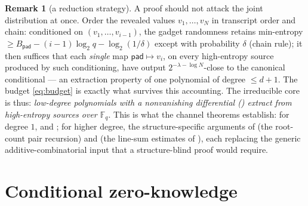 \documentclass{article}
\newcommand{\Fq}{\mathbb{F}_q}
\theoremstyle{definition}
\newtheorem{remark}[theorem]{Remark}
\begin{document}
\begin{remark}[a reduction strategy]\label{rem:hybrid}
A proof should not attack the joint distribution at once. Order the revealed values $v_1, \dots, v_N$ in transcript order and chain: conditioned on $(v_1, \dots, v_{i-1})$, the gadget randomness retains min-entropy $\geq B_{\mathsf{pad}} - (i-1)\log_2 q - \log_2(1/\delta)$ except with probability $\delta$ (chain rule); it then suffices that each \emph{single} map $\mathsf{pad} \mapsto v_i$, on every high-entropy source produced by such conditioning, have output $2^{-\lambda - \log N}$-close to the canonical conditional --- an extraction property of one polynomial of degree $\leq d + 1$. The budget \cref{eq:budget} is exactly what survives this accounting. The irreducible core is thus: \emph{low-degree polynomials with a nonvanishing differential () extract from high-entropy sources over $\Fq$}. This is what the channel theorems establish: for degree $1$,  and ; for higher degree, the structure-specific arguments of  (the root-count pair recursion) and  (the line-sum estimates of ), each replacing the generic additive-combinatorial input that a structure-blind proof would require.
\end{remark}

\section{Conditional zero-knowledge}\label{sec:zk}
\end{document}

